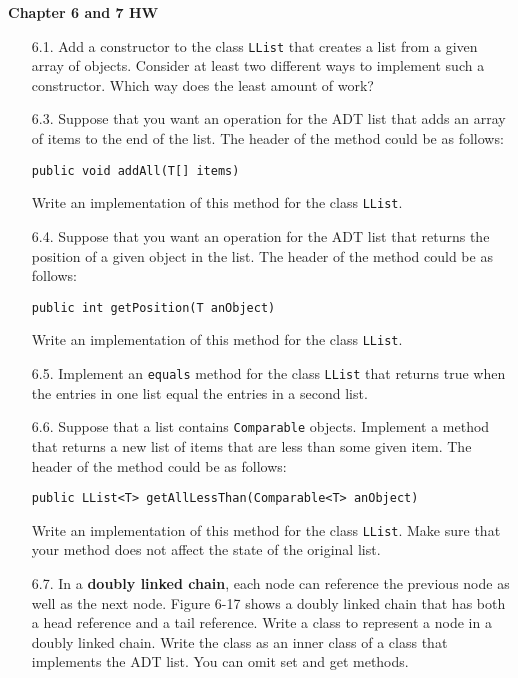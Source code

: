 \documentclass[10pt]{article}
\begin{document}
	\lstset{
		language=Java
			}
			
	\begin{center}
		\large{\textbf{Chapter 6 and 7 HW}}
	\end{center}
	
	\begin{enumerate}
		\item[6.1.] Add a constructor to the class \texttt{LList} that creates a list from a given array of objects. Consider at least two different ways to implement such a constructor. Which way does the least amount of work?
		
		\item[6.3.] Suppose that you want an operation for the ADT list that adds an array of items to the end of the list. The header of the method could be as follows:
			\begin{lstlisting}
public void addAll(T[] items)
			\end{lstlisting}
			Write an implementation of this method for the class \texttt{LList}.
		
		\item[6.4.] Suppose that you want an operation for the ADT list that returns the position of a given object in the list. The header of the method could be as follows:
			\begin{lstlisting}
public int getPosition(T anObject)
			\end{lstlisting}
			Write an implementation of this method for the class \texttt{LList}.
		
		\item[6.5.] Implement an \texttt{equals} method for the class \texttt{LList} that returns true when the entries in one list equal the entries in a second list.
		
		\item[6.6.] Suppose that a list contains \texttt{Comparable} objects. Implement a method that returns a new list of items that are less than some given item. The header of the method could be as follows:
			\begin{lstlisting}
public LList<T> getAllLessThan(Comparable<T> anObject)
			\end{lstlisting}
			Write an implementation of this method for the class \texttt{LList}. Make sure that your method does not affect the state of the original list.
			
		\item[6.7.] In a \textbf{doubly linked chain}, each node can reference the previous node as well as the next node. Figure 6-17 shows a doubly linked chain that has both a head reference and a tail reference. Write a class to represent a node in a doubly linked chain. Write the class as an inner class of a class that implements the ADT list. You can omit set and get methods.
		

\end{enumerate}
\end{document}
